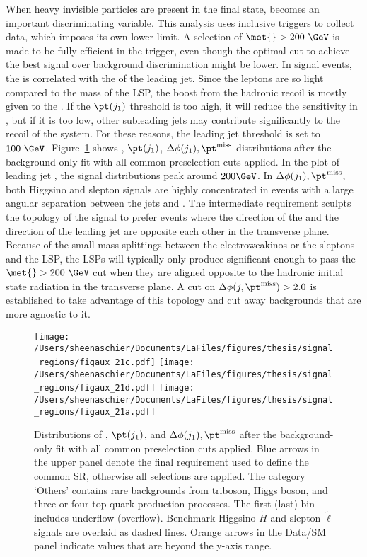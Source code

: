 When heavy invisible particles are present in the final state, \met{} becomes an important discriminating variable.  This analysis uses inclusive \met{} triggers to collect data, which imposes its own lower limit.  A selection of $\met{} >200~\GeV$ is made to be fully efficient in the \met{} trigger, even though the optimal cut to achieve the best signal over background discrimination might be lower.  In signal events, the \met is correlated with the \pt of the leading jet.  Since the leptons are so light compared to the mass of the LSP, the boost from the hadronic recoil is mostly given to the \met{}.  If the $\pt(j_1)$ threshold is too high, it will reduce the sensitivity in \met{}, but if it is too low, other subleading jets may contribute significantly to the recoil of the system.  For these reasons, the leading jet \pt threshold is set to $100~\GeV$.  Figure~\ref{fig:sr:cm2} shows \met, $\pt(j_1)$, $\Delta\phi(j_1), \pt^{\mathrm{miss}}$ distributions after the background-only fit with all common preselection cuts applied.  In the plot of leading jet \pt, the signal distributions peak around $200\GeV$.  In $\Delta\phi(j_1), \pt^{\mathrm{miss}}$, both Higgsino and slepton signals are highly concentrated in events with a large angular separation between the jets and \met.  The intermediate \met{} requirement sculpts the topology of the signal to prefer events where the direction of the \met and the direction of the leading jet are opposite each other in the transverse plane.  Because of the small mass-splittings between the electroweakinos or the sleptons and the LSP, the LSPs will typically only produce significant enough \met{} to pass the $\met{} > 200~\GeV$ cut when they are aligned opposite to the hadronic initial state radiation in the transverse plane.  A cut on $\Delta\phi(j, \pt^{\mathrm{miss}}) > 2.0$ is established to take advantage of this topology and cut away backgrounds that are more agnostic to it.  
   \begin{figure}%
  \begin{center}
  \texttt{[image: /Users/sheenaschier/Documents/LaFiles/figures/thesis/signal\_regions/figaux\_21c.pdf]}
      \texttt{[image: /Users/sheenaschier/Documents/LaFiles/figures/thesis/signal\_regions/figaux\_21d.pdf]}
         \texttt{[image: /Users/sheenaschier/Documents/LaFiles/figures/thesis/signal\_regions/figaux\_21a.pdf]}
   \end{center}
 \caption{Distributions of \met{}, $\pt(j_1)$, and $\Delta\phi(j_1), \pt^{\mathrm{miss}}$ after the background-only fit with all common preselection cuts applied.  Blue arrows in the upper panel denote the final requirement used to define the common SR, otherwise all selections are applied. The category `Others' contains rare backgrounds from triboson, Higgs boson, and three or four top-quark production processes. The first (last) bin includes underflow (overflow).  Benchmark Higgsino $\tilde H$ and slepton $\tilde\ell$ signals are overlaid as dashed lines. Orange arrows in the Data/SM panel indicate values that are beyond the y-axis range.}
 \label{fig:sr:cm2}
 \end{figure}
 
